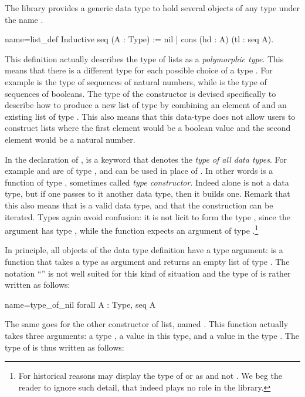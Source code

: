 The \mcbMC{} library provides a generic data type to hold
several objects of any type under the name .

\begin{coq}{name=list_def}{}
Inductive seq (A : Type) := nil | cons (hd : A) (tl : seq A).
\end{coq}
This definition actually describes the type of lists as a {\em
  polymorphic type}.  This means that there is a different type
 for each possible choice of a type .  For example
 is the type of sequences of natural numbers, while
 is the type of sequences of booleans.
The type of the
constructor  is devised specifically to describe how to produce a
new list of type  by combining an element of  and an
existing list of type .  This also means that this data-type
does not allow users to construct lists where the first element would be
a boolean value and the second element would be a natural number.

In the declaration of ,  is a keyword that denotes the
\emph{type of all data types}.  For example  and  are of type
, and can be used in place of .
In other words  is a function of type , sometimes
called \emph{type constructor}.  Indeed  alone is not a data type,
but if one passes to it another data type, then it builds one.  Remark
that this also means that  is a valid data type, and
that the construction can be iterated.
Types again avoid confusion: it is not licit to form the type ,
since the argument  has type , while the function
 expects an argument of type .\footnote{For historical
reasons \Coq{} may display the type of  or  as 
and not .  We beg the reader to ignore such detail, that indeed
plays no role in the \mcbMC{} library.}

In principle, all objects of the data type definition have a type
argument:  
 is a function that takes a type  as argument and returns
an empty list of type .  The notation ``'' is not
well suited for this kind of situation and the type of  is
rather written as follows:

\begin{coq}{name=type_of_nil}{}
  forall A : Type, seq A
\end{coq}
The same goes for the other constructor of list, named .  This
function actually takes three arguments: a type , a value in this
type, and a value in the type .  The type of  is
thus written as follows:

